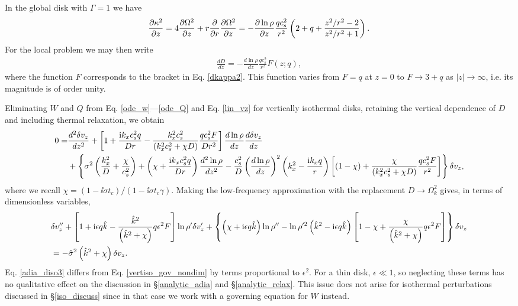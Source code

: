 In the global disk with $\Gamma=1$ we have
\begin{align}\label{dkappa2}
  \frac{\partial\kappa^2}{\partial z} = 4 \frac{\partial\Omega^2}{\partial z} + r\frac{\partial}{\partial
    r}\frac{\partial\Omega^2}{\partial z} = -
  \frac{\partial\ln\rho}{\partial z}\frac{qc_s^2}{r^2} \left(2 + q +
    \frac{z^2/r^2-2}{z^2/r^2+1}\right). 
\end{align}
For the local problem we may then write
\begin{align}
  \frac{dD}{dz}  = - \frac{d\ln\rho}{dz}\frac{qc_s^2}{r^2}F(z;q),
\end{align}
where the function $F$ corresponds to the bracket in
Eq. \ref{dkappa2}. This function varies from $F=q$ at $z=0$ to $F\to
3+q$ as $|z|\to\infty$, i.e. its magnitude is of order unity. 

 Eliminating $W$ and $Q$ from Eq. \ref{ode_w}---\ref{ode_Q} and
 Eq. \ref{lin_vz} for vertically isothermal disks, retaining the
 vertical dependence of $D$ and including thermal relaxation, we
 obtain 
\begin{align}
  0 =& \frac{d^2\delta v_z}{dz^2} + \left[1 + \frac{\mathrm{i} k_x c_s^2
      q}{Dr} - \frac{k_x^2c_s^2}{\left(k_x^2c_s^2 + \chi
        D\right)}\frac{qc_s^2F}{Dr^2}\right]\frac{d\ln\rho}{dz}\frac{d\delta
    v_z}{dz} \notag\\
  &+ \left\{\sigma^2\left(\frac{k_x^2}{D} +
      \frac{\chi}{c_s^2}\right) + \left(\chi + \frac{\mathrm{i} k_x c_s^2
        q}{Dr}\right)\frac{d^2\ln\rho}{dz^2} -
    \frac{c_s^2}{D}\left(\frac{d\ln\rho}{dz}\right)^2\left(k_x^2 -
      \frac{\mathrm{i} k_x q}{r}\right)
   \left[\left(1-\chi\right) +
     \frac{\chi}{\left(k_x^2c_s^2 + \chi D\right)}\frac{qc_s^2 F}{r^2}\right] 
   \right\}\delta v_z,
\end{align}
where we recall $\chi = \left(1-\ii\sigma t_c\right)/\left(1-\ii\sigma
t_c \gamma\right)$. Making the low-frequency approximation with the
replacement $D\to \Omega_k^2$ gives, in terms of dimensionless
variables,
\begin{align}
   &\delta v_z ^{\prime\prime} + \left[1 + \mathrm{i}\epsilon q\hat{k} -
    \frac{ \hat{k}^2}{
      \left(\hat{k}^2+\chi\right)}q \epsilon^2F\right]\ln\rho^{\prime}\delta v_z^\prime +
  \left\{\left(\chi + \mathrm{i} \epsilon q
      \hat{k}\right)\ln\rho^{\prime\prime} - \ln\rho^{\prime
      2}\left(\hat{k}^2 -
      \mathrm{i}\epsilon
      q\hat{k}\right)\left[1 - \chi +
      \frac{\chi}{\left(\hat{k}^2+\chi\right)}q\epsilon^2F\right]\right\}\delta v_z \notag\\&=
  -\hat{\sigma}^2\left(\hat{k}^2+\chi\right)\delta v_z\label{adia_diso3}.
\end{align}   
Eq. \ref{adia_diso3} differs from Eq. \ref{vertiso_gov_nondim} by terms
proportional to $\epsilon^2$. For a thin disk, $\epsilon\ll1$, so
neglecting these terms has no qualitative effect on the discussion in
\S\ref{analytic_adia} and \S\ref{analytic_relax}.  This issue does not
arise for isothermal perturbations discussed in \S\ref{iso_discuss}
since in that case we work with a governing equation for $W$ instead. 

